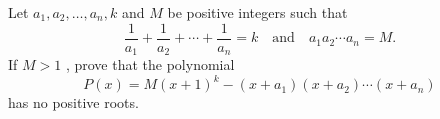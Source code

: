 Let 
$a_1,a_2,\ldots, a_n,k$
 and 
$M$
 be positive integers such that
$$\frac{1}{a_1}+\frac{1}{a_2}+\cdots+\frac{1}{a_n}=k\quad\text{and}\quad a_1a_2\cdots a_n=M.$$
If 
$M >1$
,
 prove that the polynomial
$$P(x)=M(x+1)^k-(x+a_1)(x+a_2)\cdots (x+a_n)$$
has no positive roots.
